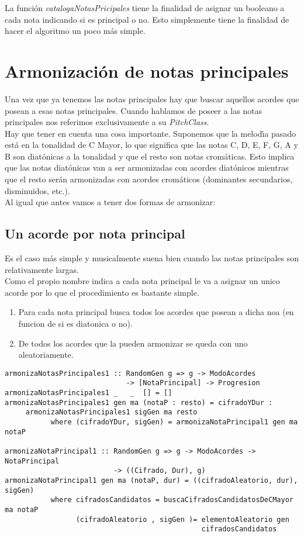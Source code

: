 \normalsize
\indent La funci\'on \emph{catalogaNotasPricipales} tiene la finalidad de
asignar un booleano a cada nota indicando si es principal o no.
Esto simplemente tiene la finalidad de hacer el algoritmo un 
poco m\'as simple.\\

\section{Armonizaci\'on de notas principales}
Una vez que ya tenemos las notas principales hay que buscar aquellos
acordes que posean a esas notas principales. Cuando hablamos de
poseer a las notas principales nos referimos exclusivamente
a su \emph{PitchClass}.\\
\indent Hay que tener en cuenta una cosa importante. Suponemos que la 
melod\'\i a pasado est\'a en la tonalidad de C Mayor, lo que
significa que las notas C, D, E, F, G, 
A y B son diat\'onicas a la tonalidad
y que el resto son notas crom\'aticas. Esto implica que las notas 
diat\'onicas van a ser armonizadas con acordes diat\'onicos mientras 
que el resto ser\'an armonizadas con acordes crom\'aticos (dominantes
secundarios, disminuidos, etc.).\\
\indent Al igual que antes vamos a tener dos formas de armonizar:

\subsection{Un acorde por nota principal}
Es el caso m\'as simple y musicalmente suena bien cuando las
notas principales son relativamente largas.\\
\indent Como el propio nombre indica a cada nota principal le va a 
asignar un unico acorde por lo que el procedimiento es bastante simple.

\begin{enumerate}
\item Para cada nota principal busca todos los acordes que posean a dicha
noa (en funcion de si es diatonica o no).
\item De todos los acordes que la pueden armonizar se queda con
uno aleatoriamente.
\end{enumerate}
\small
\begin{verbatim}
armonizaNotasPrincipales1 :: RandomGen g => g -> ModoAcordes 
                             -> [NotaPrincipal] -> Progresion
armonizaNotasPrincipales1 _   _  [] = []
armonizaNotasPrincipales1 gen ma (notaP : resto) = cifradoYDur : 
     armonizaNotasPrincipales1 sigGen ma resto
           where (cifradoYDur, sigGen) = armonizaNotaPrincipal1 gen ma notaP

armonizaNotaPrincipal1 :: RandomGen g => g -> ModoAcordes -> NotaPrincipal 
                          -> ((Cifrado, Dur), g)
armonizaNotaPrincipal1 gen ma (notaP, dur) = ((cifradoAleatorio, dur), sigGen)
           where cifradosCandidatos = buscaCifradosCandidatosDeCMayor ma notaP
                 (cifradoAleatorio , sigGen )= elementoAleatorio gen 
                                               cifradosCandidatos 
\end{verbatim}
\normalsize

